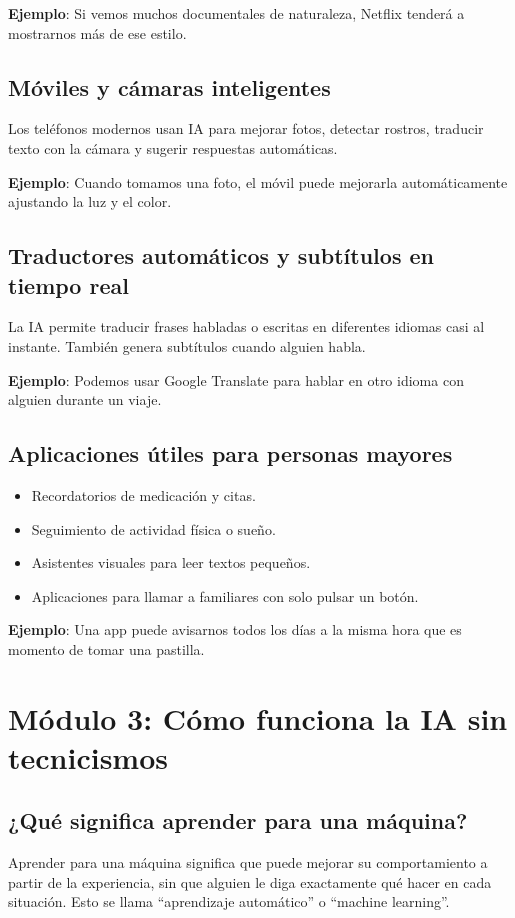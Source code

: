 \documentclass[12pt]{article}
\begin{document}
	\textbf{Ejemplo}: Si vemos muchos documentales de naturaleza, Netflix tenderá a mostrarnos más de ese estilo.
	
	\subsection*{Móviles y cámaras inteligentes}
	Los teléfonos modernos usan IA para mejorar fotos, detectar rostros, traducir texto con la cámara y sugerir respuestas automáticas.
	
	\textbf{Ejemplo}: Cuando tomamos una foto, el móvil puede mejorarla automáticamente ajustando la luz y el color.
	
	\subsection*{Traductores automáticos y subtítulos en tiempo real}
	La IA permite traducir frases habladas o escritas en diferentes idiomas casi al instante. También genera subtítulos cuando alguien habla.
	
	\textbf{Ejemplo}: Podemos usar Google Translate para hablar en otro idioma con alguien durante un viaje.
	
	\subsection*{Aplicaciones útiles para personas mayores}
	\begin{itemize}
		\item Recordatorios de medicación y citas.
		\item Seguimiento de actividad física o sueño.
		\item Asistentes visuales para leer textos pequeños.
		\item Aplicaciones para llamar a familiares con solo pulsar un botón.
	\end{itemize}
	
	\textbf{Ejemplo}: Una app puede avisarnos todos los días a la misma hora que es momento de tomar una pastilla.
	
	\newpage
	
	\section{\textbf{\normalsize Módulo 3: Cómo funciona la IA sin tecnicismos}}
	
	\subsection*{¿Qué significa aprender para una máquina?}
	Aprender para una máquina significa que puede mejorar su comportamiento a partir de la experiencia, sin que alguien le diga exactamente qué hacer en cada situación. Esto se llama “aprendizaje automático” o “machine learning”.
	
\end{document}
